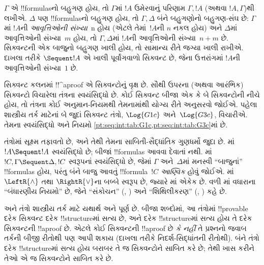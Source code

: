 \documentclass[../../../include/open-logic-section]{subfiles}
\begin{document}
$\Gamma$ એ !!{formula}sનો બહુગણ હોય,
તો $\Gamma$માં $!A$ ઉમેરવાનું પરિણામ
$\Gamma, !A$ (અથવા $!A, \Gamma$)થી લખીએ.
$\Delta$ પણ !!{formula}sનો બહુગણ હોય,
તો $\Gamma, \Delta$ બંને બહુગણોનો બહુગણ-સંઘ છે:
$\Gamma$માં $!A$ની \emph{આવૃત્તિઓની સંખ્યા}~n હોય
(એટલે તેમાં~$!A$ની $n$ નકલ હોય)
અને $\Delta$માં આવૃત્તિઓની સંખ્યા~$m$ હોય,
તો $\Gamma, \Delta$માં $!A$ની આવૃત્તિઓની સંખ્યા~$n+m$ છે.
સિક્વન્ટની એક બાજુનો બહુગણ ખાલી હોય,
તો સામાન્ય રીતે જગ્યા ખાલી રાખીએ.
દાખલા તરીકે $\Sequent !A$ એ ખાલી પૂર્વાંગવાળો સિક્વન્ટ છે,
જેના ઉત્તરાંગમાં $!A$ની આવૃત્તિઓની સંખ્યા~$1$ છે.

સિક્વન્ટ કલનમાં !!^a{proof} એ સિક્વન્ટોનું વૃક્ષ છે.
સૌથી ઉપરના (અથવા આરંભિક) સિક્વન્ટો
વિચારેલા તંત્રના સ્વયંસિદ્ધો છે.
કોઈ સિક્વન્ટ બીજા એક કે બે સિક્વન્ટોની નીચે હોય,
તો તંત્રના કોઈ અનુમાન-નિયમથી તેમનામાંથી યોગ્ય રીતે અનુસરવો જોઈએ.
પહેલા શાસ્ત્રીય તર્ક માટેનાં બે જુદાં સિક્વન્ટ તંત્રો,
$\Log{G1c}$ અને~$\Log{G3c}$, વિચારીએ.
તેમના સ્વયંસિદ્ધો અને નિયમો
\cref{pt:seq:int:tab:G1c,pt:seq:int:tab:G3c}માં છે.




તંત્રોમાં સૂક્ષ્મ તફાવતો છે, અને તેથી તેમના
સાબિતી-સૈદ્ધાંતિક ગુણધર્મો જુદા છે.
માં $!A \Sequent !A$ સ્વયંસિદ્ધો છે;
બીજાં !!{formula}s આવવા દેવાતાં નથી.
માં $!C, \Gamma \Sequent \Delta, !C$
સ્વરૂપનાં સ્વયંસિદ્ધો છે, જેમાં $\Gamma$ અને~$\Delta$માં
મનસ્વી ``બાજુનાં'' !!{formula}s હોય,
પરંતુ બંને બાજુ આવતું !!{formula}~$!C$ \emph{આણ્વિક} હોવું જોઈએ.
માં $\LeftR{\land}$ તથા $\RightR{\lor}$ના
બબ્બે સ્વરૂપ છે, જ્યારે માં એકેક છે.
વળી માં વધારાના ``બંધારણીય નિયમો'' છે,
જેને ``સંકોચન'' (\LeftR{\Contraction}, \RightR{\Contraction})
અને ``શિથિલીકરણ'' (\LeftR{\Weakening}, \RightR{\Weakening}) કહે છે.

 અને  તંત્રો શાસ્ત્રીય તર્ક માટે યથાર્થ અને પૂર્ણ છે.
બીજા શબ્દોમાં, આ તંત્રોમાં !!{provable} દરેક સિક્વન્ટ
દરેક !!{structure}માં સત્ય છે,
અને દરેક !!{structure}માં સત્ય હોય તે દરેક સિક્વન્ટની !!a{proof} છે.
એટલે કોઈ સિક્વન્ટની !!a{proof} છે \emph{કે નહીં} તે પ્રશ્નનો
જવાબ તર્કની બીજી રીતોથી પણ આપી શકાય
(દાખલા તરીકે નિદર્શ-સિદ્ધાંતની રીતોથી).
બંને તંત્રો દરેક !!{structure}માં સત્ય હોય
બરાબર તે જ સિક્વન્ટોને સાબિત કરે છે;
તેથી ખાસ કરીને તેઓ એ જ સિક્વન્ટોને સાબિત કરે છે.
\end{document}
